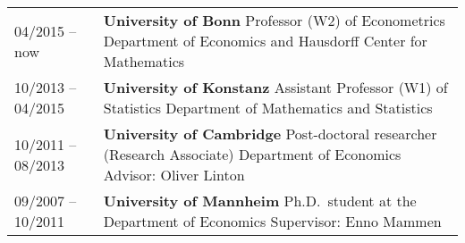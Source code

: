 \documentclass[a4paper,12pt]{article}
\begin{document}
\vspace{0.3cm}
\begin{tabular}{@{} p{3.75cm} p{12cm}}
04/2015 -- now      & {\textbf{University of Bonn} \vspace{1pt} \newline 
                       Professor (W2) of Econometrics \newline
                       Department of Economics and \newline
                       Hausdorff Center for Mathematics} \\
10/2013 -- 04/2015  & {\textbf{University of Konstanz} \vspace{1pt} \newline 
                       Assistant Professor (W1) of Statistics \newline
                       Department of Mathematics and Statistics} \\
10/2011 -- 08/2013  & {\textbf{University of Cambridge} \vspace{1pt} \newline 
                       Post-doctoral researcher (Research Associate) \newline 
                       Department of Economics \newline
                       Advisor: Oliver Linton} \\
09/2007 -- 10/2011  & {\textbf{University of Mannheim} \vspace{1pt} \newline 
                       Ph.D.\ student at the Department of Economics \newline
                       Supervisor: Enno Mammen}                    
\end{tabular}
\vspace{0.5cm}


\end{document}
